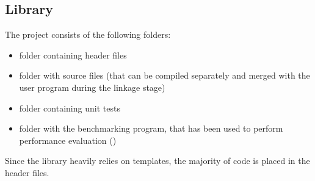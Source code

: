 \subsection{Library}
The project consists of the following folders:
\begin{itemize}
\item [\pathname{include/numdb}] folder containing header files
\item [\pathname{lib}] folder with source files (that can be compiled separately and merged with the user program during the linkage stage)
\item [\pathname{test}] folder containing unit tests
\item [\pathname{benchmark}] folder with the benchmarking program, that has been used to perform performance evaluation ()
\end{itemize}
Since the library heavily relies on templates, the majority of code is placed in the header files.


